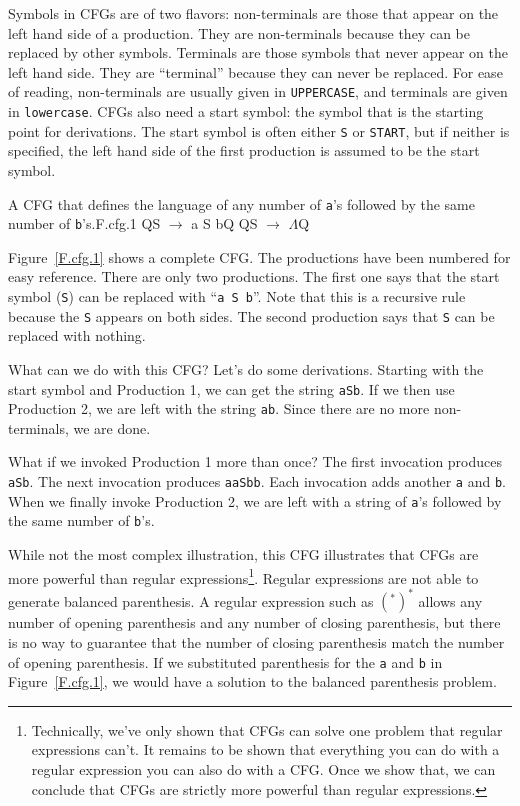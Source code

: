 \documentclass[letterpaper,12pt,openany,reqno]{book}%
\newcommand{\code}[1] {\lstinline[breaklines=yes,breakatwhitespace=yes]{#1}}
\newcommand{\cfgprod}[2] {{\ttfamily #1} $\rightarrow$ {\ttfamily #2}}
\begin{document}
Symbols in CFGs are of two flavors: non-terminals are those that appear on the left hand side of a production. They are non-terminals because they can be replaced by other symbols. Terminals are those symbols that never appear on the left hand side. They are ``terminal'' because they can never be replaced. For ease of reading, non-terminals are usually given in \texttt{UPPERCASE}, and terminals are given in \texttt{lowercase}. CFGs also need a start symbol: the symbol that is the starting point for derivations. The start symbol is often either \code{S} or \code{START}, but if neither is specified, the left hand side of the first production is assumed to be the start symbol.

\begin{cfg}{A CFG that defines the language of any number of \code{a}'s followed by the same number of \code{b}'s.}{F.cfg.1}
Q\cfgprod{S}{a S b}Q
Q\cfgprod{S}{$\Lambda$}Q
\end{cfg}

Figure~\ref{F.cfg.1} shows a complete CFG. The productions have been numbered for easy reference. There are only two productions. The first one says that the start symbol (\code{S}) can be replaced with ``\code{a S b}''. Note that this is a recursive rule because the \code{S} appears on both sides. The second production says that \code{S} can be replaced with nothing.

What can we do with this CFG? Let's do some derivations. Starting with the start symbol and Production 1, we can get the string \code{aSb}. If we then use Production 2, we are left with the string \code{ab}. Since there are no more non-terminals, we are done.

What if we invoked Production 1 more than once? The first invocation produces \code{aSb}. The next invocation produces \code{aaSbb}. Each invocation adds another \code{a} and \code{b}. When we finally invoke Production 2, we are left with a string of \code{a}'s followed by the same number of \code{b}'s.

While not the most complex illustration, this CFG illustrates that CFGs are more powerful than regular expressions\footnote{Technically, we've only shown that CFGs can solve one problem that regular expressions can't. It remains to be shown that everything you can do with a regular expression you can also do with a CFG. Once we show that, we can conclude that CFGs are strictly more powerful than regular expressions.}. Regular expressions are not able to generate balanced parenthesis. A regular expression such as $(^*)^*$ allows any number of opening parenthesis and any number of closing parenthesis, but there is no way to guarantee that the number of closing parenthesis match the number of opening parenthesis. If we substituted parenthesis for the \code{a} and \code{b} in Figure~\ref{F.cfg.1}, we would have a solution to the balanced parenthesis problem.
\end{document}
